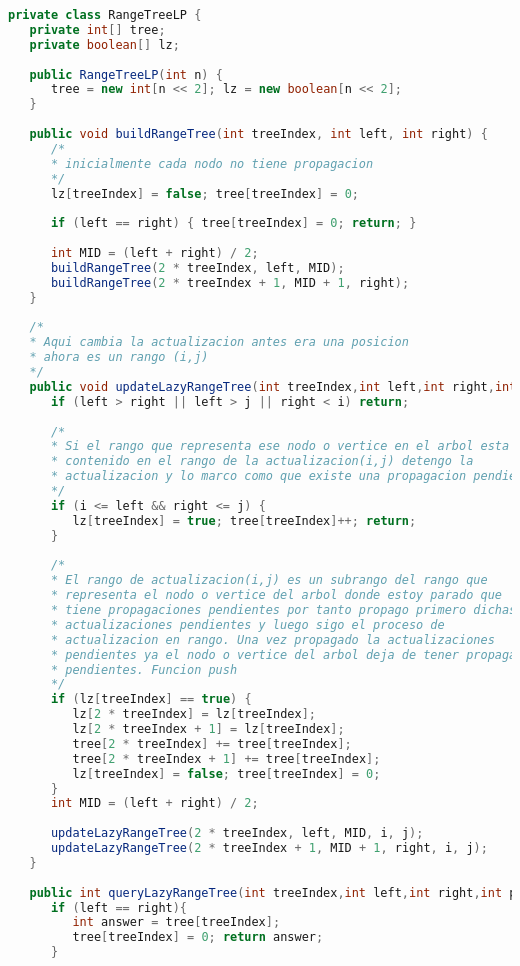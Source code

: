 \begin{lstlisting}[language=Java]
private class RangeTreeLP {
   private int[] tree;
   private boolean[] lz;
	
   public RangeTreeLP(int n) {
      tree = new int[n << 2]; lz = new boolean[n << 2];
   }
	
   public void buildRangeTree(int treeIndex, int left, int right) {
      /*
      * inicialmente cada nodo no tiene propagacion
      */
      lz[treeIndex] = false; tree[treeIndex] = 0;
      
      if (left == right) { tree[treeIndex] = 0; return; }
      
      int MID = (left + right) / 2;
      buildRangeTree(2 * treeIndex, left, MID);
      buildRangeTree(2 * treeIndex + 1, MID + 1, right);
   }
	
   /*
   * Aqui cambia la actualizacion antes era una posicion 
   * ahora es un rango (i,j)
   */
   public void updateLazyRangeTree(int treeIndex,int left,int right,int i,int j){
      if (left > right || left > j || right < i) return;
		
      /*
      * Si el rango que representa ese nodo o vertice en el arbol esta 
      * contenido en el rango de la actualizacion(i,j) detengo la 
      * actualizacion y lo marco como que existe una propagacion pendiente
      */
      if (i <= left && right <= j) {
         lz[treeIndex] = true; tree[treeIndex]++; return;
      }
		
      /*
      * El rango de actualizacion(i,j) es un subrango del rango que 
      * representa el nodo o vertice del arbol donde estoy parado que 
      * tiene propagaciones pendientes por tanto propago primero dichas 
      * actualizaciones pendientes y luego sigo el proceso de 
      * actualizacion en rango. Una vez propagado la actualizaciones 
      * pendientes ya el nodo o vertice del arbol deja de tener propagaciones 
      * pendientes. Funcion push
      */
      if (lz[treeIndex] == true) {
         lz[2 * treeIndex] = lz[treeIndex]; 
         lz[2 * treeIndex + 1] = lz[treeIndex];
         tree[2 * treeIndex] += tree[treeIndex]; 
         tree[2 * treeIndex + 1] += tree[treeIndex];
         lz[treeIndex] = false; tree[treeIndex] = 0;
      }
      int MID = (left + right) / 2;
      
      updateLazyRangeTree(2 * treeIndex, left, MID, i, j);
      updateLazyRangeTree(2 * treeIndex + 1, MID + 1, right, i, j);
   }
	
   public int queryLazyRangeTree(int treeIndex,int left,int right,int pos){
      if (left == right){
         int answer = tree[treeIndex];
         tree[treeIndex] = 0; return answer;
      }
      

\end{lstlisting}
